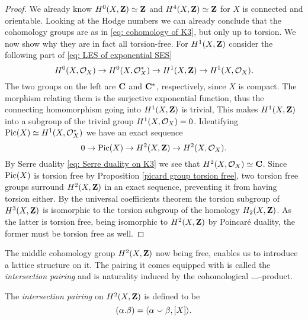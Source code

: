 \begin{proof}
    We already know $H^{0}(X, \mathbf Z) \simeq \mathbf Z$ and $H^{4}(X, \mathbf Z) \simeq \mathbf Z$ for $X$ is connected and orientable. Looking at the Hodge numbers
    we can already conclude that the cohomology groups are as in \eqref{eq: cohomology of K3}, but only up to torsion. 
    We now show why they are in fact all torsion-free. For $H^{1}(X, \mathbf Z)$ consider the following part of \eqref{eq: LES of exponential SES} 
    \[
        H^{0}(X, {\mathcal{O}_{X}}) \to H^{0}(X, \mathcal O_X^*) \to H^{1}(X, \mathbf Z) \to H^{1}(X, {\mathcal{O}_{X}}).
    \]
    The two groups on the left are $\mathbf C$ and $\mathbf C^*$, respectively, since $X$ is compact. The morphism relating them is the surjective exponential function, thus the connecting homomorphism going into $H^{1}(X, \mathbf Z)$ is trivial, This makes $H^{1}(X, \mathbf Z)$ into a subgroup of the trivial group $H^{1}(X, {\mathcal{O}_{X}}) = 0$.
    Identifying $\operatorname{Pic}(X) \simeq H^{1}(X, \mathcal O_X^*)$ we have an exact sequence
    \[
        0 \to \operatorname{Pic}(X) \to H^{2}(X, \mathbf Z) \to H^{2}(X, {\mathcal{O}_{X}}).
    \]
    By Serre duality \eqref{eq: Serre duality on K3} we see that $H^{2}(X, {\mathcal{O}_{X}}) \simeq \mathbf C$. 
    Since $\operatorname{Pic}(X)$ is torsion free by Proposition \ref{picard group torsion free}, two torsion free groups surround $H^{2}(X, \mathbf Z)$ in an exact sequence, preventing it from having torsion either.
    By the universal coefficients theorem the torsion subgroup of $H^{3}(X, \mathbf Z)$ is isomorphic to the torsion subgroup of the homology $H_2(X,\mathbf Z)$. As the latter is torsion free, being isomorphic to $H^{2}(X, \mathbf Z)$ by Poincaré duality, the former must be torsion free as well. 
\end{proof}

The middle cohomology group $H^{2}(X, \mathbf Z)$ now being free, enables us to introduce a lattice structure on it. The pairing it comes equipped with is called the \emph{intersection pairing} and is naturality induced by the cohomological $\smallsmile$-product. 
\begin{definition}
    The \emph{intersection pairing} on $H^{2}(X, \mathbf Z)$ is defined to be 
    \[
        (\alpha.\beta) = \langle \alpha \smallsmile \beta, [X] \rangle.
    \] 
\end{definition}

